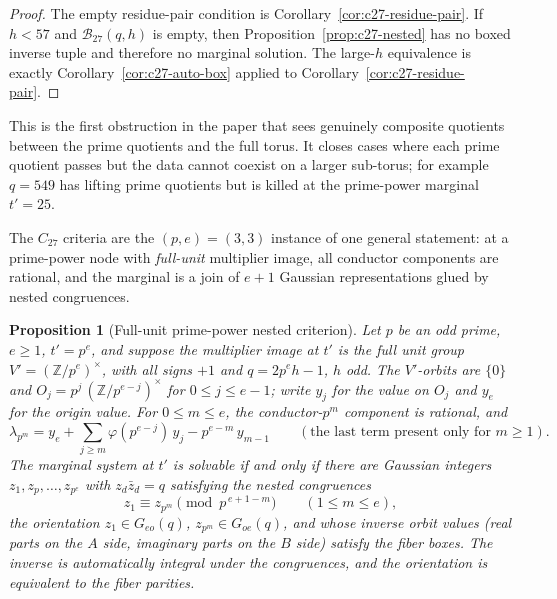 \documentclass[11pt]{article}
\theoremstyle{plain}
\newtheorem{proposition}[theorem]{Proposition}
\theoremstyle{definition}
\theoremstyle{remark}
\newcommand{\Z}{\mathbb Z}
\begin{document}
\begin{proof}
The empty residue-pair condition is Corollary~\ref{cor:c27-residue-pair}.  If
$h<57$ and $\mathcal B_{27}(q,h)$ is empty, then
Proposition~\ref{prop:c27-nested} has no boxed inverse tuple and therefore no
marginal solution.  The large-$h$ equivalence is exactly
Corollary~\ref{cor:c27-auto-box} applied to
Corollary~\ref{cor:c27-residue-pair}.
\end{proof}

This is the first obstruction in the paper that sees genuinely composite
quotients between the prime quotients and the full torus. It closes cases where
each prime quotient passes but the data cannot coexist on a larger sub-torus;
for example $q=549$ has lifting prime quotients but is killed at the
prime-power marginal $t'=25$.

The $C_{27}$ criteria are the $(p,e)=(3,3)$ instance of one general
statement: at a prime-power node with \emph{full-unit} multiplier image,
all conductor components are rational, and the marginal is a join of
$e{+}1$ Gaussian representations glued by nested congruences.

\begin{proposition}[Full-unit prime-power nested criterion]
\label{prop:pe-full-unit-nested}
Let $p$ be an odd prime, $e\ge1$, $t'=p^e$, and suppose the multiplier
image at $t'$ is the full unit group $V'=(\Z/p^e)^\times$, with all
signs $+1$ and $q=2p^eh-1$, $h$ odd.  The $V'$-orbits are $\{0\}$ and
$O_j=p^j\,(\Z/p^{e-j})^\times$ for $0\le j\le e-1$; write $y_j$ for the
value on $O_j$ and $y_e$ for the origin value.  For $0\le m\le e$, the
conductor-$p^m$ component is rational, and
\[
  \lambda_{p^m}
  =y_e+\sum_{j\ge m}\varphi(p^{e-j})\,y_j-p^{e-m}\,y_{m-1}
  \qquad(\text{the last term present only for }m\ge1).
\]
The marginal system at $t'$ is solvable if and only if there are
Gaussian integers $z_1,z_p,\dots,z_{p^e}$ with $z_d\bar z_d=q$
satisfying the nested congruences
\[
  z_1\equiv z_{p^m}\pmod{p^{\,e+1-m}}\qquad(1\le m\le e),
\]
the orientation $z_1\in G_{eo}(q)$, $z_{p^m}\in G_{oe}(q)$, and whose
inverse orbit values (real parts on the $A$ side, imaginary parts on
the $B$ side) satisfy the fiber boxes.  The inverse is automatically
integral under the congruences, and the orientation is equivalent to
the fiber parities.
\end{proposition}
\end{document}
